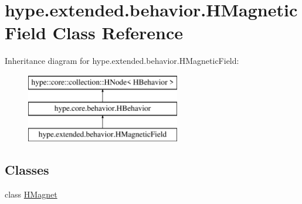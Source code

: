 \hypertarget{classhype_1_1extended_1_1behavior_1_1_h_magnetic_field}{\section{hype.\-extended.\-behavior.\-H\-Magnetic\-Field Class Reference}
\label{classhype_1_1extended_1_1behavior_1_1_h_magnetic_field}
}
Inheritance diagram for hype.\-extended.\-behavior.\-H\-Magnetic\-Field\-:\begin{figure}[H]
\begin{center}
\leavevmode
\includegraphics[height=3.000000cm]{classhype_1_1extended_1_1behavior_1_1_h_magnetic_field}
\end{center}
\end{figure}
\subsection*{Classes}
\begin{DoxyCompactItemize}
\item 
class \hyperlink{classhype_1_1extended_1_1behavior_1_1_h_magnetic_field_1_1_h_magnet}{H\-Magnet}
\end{DoxyCompactItemize}
